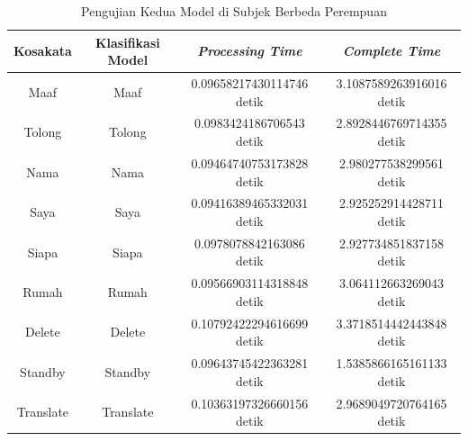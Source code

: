 \begin{longtable}{|c|c|c|c|}
  \caption{Pengujian Kedua Model di Subjek Berbeda Perempuan}
  \label{tb:prediksiperempuan2}                                   \\
  \hline
  \rowcolor[HTML]{C0C0C0}
  \textbf{Kosakata} & \textbf{Klasifikasi Model} & \textbf{\emph{Processing Time}} & \textbf{\emph{Complete Time}}\\
  \hline
  Maaf              & Maaf                         & 0.09658217430114746 detik                           & 3.1087589263916016 detik                                  \\
  Tolong            & Tolong                       & 0.0983424186706543 detik                            & 2.8928446769714355 detik                                  \\
  Nama              & Nama                         & 0.09464740753173828 detik                           & 2.980277538299561 detik                                 \\
  Saya              & Saya                         & 0.09416389465332031 detik                           & 2.925252914428711 detik                                 \\
  Siapa             & Siapa                        & 0.0978078842163086 detik                            & 2.927734851837158 detik                                 \\
  Rumah             & Rumah                        & 0.09566903114318848 detik                           & 3.064112663269043 detik                                 \\
  Delete            & Delete                       & 0.10792422294616699 detik                           & 3.3718514442443848 detik                                  \\
  Standby           & Standby                      & 0.09643745422363281 detik                           & 1.5385866165161133 detik                                  \\
  Translate         & Translate                    & 0.10363197326660156 detik                           & 2.9689049720764165 detik                                  \\
  \hline
\end{longtable}

